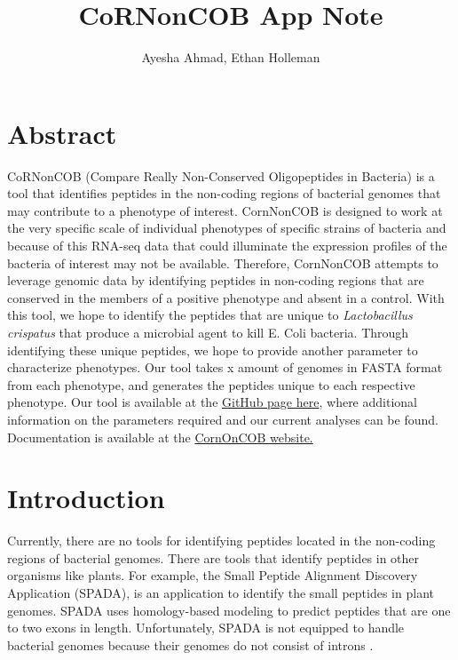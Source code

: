 \documentclass{article}
\begin{document}
\title{CoRNonCOB App Note
	   \medskip \large}
\author{Ayesha Ahmad, Ethan Holleman}

\maketitle

\newpage

\section{Abstract}
CoRNonCOB (Compare Really Non-Conserved Oligopeptides in Bacteria) is a tool that identifies peptides in the non-coding regions of bacterial genomes that may contribute to a phenotype of interest. CornNonCOB is designed to work at the very specific scale of individual phenotypes of specific strains of bacteria and because of this RNA-seq data that could illuminate the expression profiles of the bacteria of interest may not be available. Therefore, CornNonCOB attempts to leverage genomic data by identifying peptides in non-coding regions that are conserved in the members of a positive phenotype and absent in a control. With this tool, we hope to identify the peptides that are unique to \emph{Lactobacillus crispatus} that produce a microbial agent to kill E. Coli bacteria. Through identifying these unique peptides, we hope to provide another parameter to characterize phenotypes. Our tool takes x amount of genomes in FASTA format  from each phenotype, and generates the peptides unique to each respective phenotype. Our tool is available at the \href{ https://github.com/EthanHolleman/CoRNonCOB}{GitHub page here}, where additional information on the parameters required and our current analyses can be found. Documentation is available at the \href{https://ethanholleman.github.io/CoRNonCOB/index.html}{CornOnCOB website.}

\section{Introduction}
Currently, there are no tools for identifying peptides located in the non-coding regions of bacterial genomes. There are tools that identify peptides in other organisms like plants. For example, the Small Peptide Alignment Discovery Application (SPADA), is an application to identify the small peptides in plant genomes. SPADA uses homology-based modeling to predict peptides that are one to two exons in length. Unfortunately, SPADA is not equipped to handle bacterial genomes because their genomes do not consist of introns \cite{zhou_silverstein_gao_walton_nallu_guhlin_young_2013}.
\\
\end{document}
